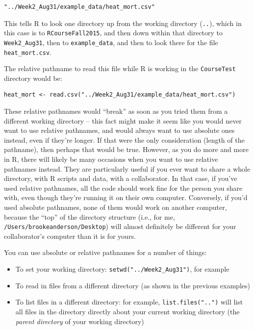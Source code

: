 \documentclass[]{book}
\providecommand{\tightlist}{%
  \setlength{\itemsep}{0pt}\setlength{\parskip}{0pt}}
\begin{document}
\begin{verbatim}
"../Week2_Aug31/example_data/heat_mort.csv"
\end{verbatim}

This tells R to look one directory up from the working directory
(\texttt{..}), which in this case is to \texttt{RCourseFall2015}, and
then down within that directory to \texttt{Week2\_Aug31}, then to
\texttt{example\_data}, and then to look there for the file
\texttt{heat\_mort.csv}.

The relative pathname to read this file while R is working in the
\texttt{CourseTest} directory would be:

\begin{verbatim}
heat_mort <- read.csv("../Week2_Aug31/example_data/heat_mort.csv")
\end{verbatim}

These relative pathnames would ``break'' as soon as you tried them from
a different working directory -- this fact might make it seem like you
would never want to use relative pathnames, and would always want to use
absolute ones instead, even if they're longer. If that were the only
consideration (length of the pathname), then perhaps that would be true.
However, as you do more and more in R, there will likely be many
occasions when you want to use relative pathnames instead. They are
particularly useful if you ever want to share a whole directory, with R
scripts and data, with a collaborator. In that case, if you've used
relative pathnames, all the code should work fine for the person you
share with, even though they're running it on their own computer.
Conversely, if you'd used absolute pathnames, none of them would work on
another computer, because the ``top'' of the directory structure (i.e.,
for me, \texttt{/Users/brookeanderson/Desktop}) will almost definitely
be different for your collaborator's computer than it is for yours.

You can use absolute or relative pathnames for a number of things:

\begin{itemize}
\tightlist
\item
  To set your working directory: \texttt{setwd("../Week2\_Aug31")}, for
  example
\item
  To read in files from a different directory (as shown in the previous
  examples)
\item
  To list files in a different directory: for example,
  \texttt{list.files("..")} will list all files in the directory
  directly about your current working directory (the \emph{parent
  directory} of your working directory)
\end{itemize}
\end{document}
